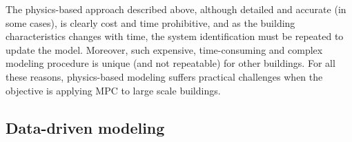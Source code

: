 \textcolor[rgb]{0,0,1}{The physics-based approach described above, although detailed and accurate (in some cases), is clearly cost and time prohibitive, and as the building characteristics changes with time, the system identification must be repeated to update the model. Moreover, such expensive, time-consuming and complex modeling procedure is unique (and not repeatable) for other buildings. For all these reasons, physics-based modeling suffers practical challenges when the objective is applying MPC to large scale buildings.
} 






\subsection{Data-driven modeling}

